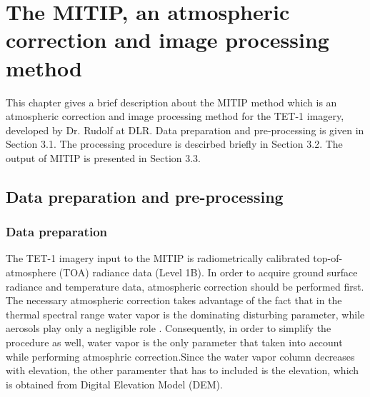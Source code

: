 \chapter{The MITIP, an atmospheric correction and image processing method}

\label{Chapter3}

This chapter gives a brief description about the MITIP method which is an atmospheric correction and image processing method for the TET-1 imagery, developed by Dr. Rudolf at DLR. Data preparation and pre-processing is given in Section 3.1. The processing procedure is descirbed briefly in Section 3.2. The output of MITIP is presented in Section 3.3.\\


\section{Data preparation and pre-processing}


\subsection{Data preparation}
The TET-1 imagery input to the MITIP is radiometrically calibrated top-of-atmosphere (TOA) radiance data (Level 1B). In order to acquire ground surface radiance and temperature data, atmospheric correction should be performed first.\\

\noindent The necessary atmospheric correction takes advantage of the fact that in the thermal spectral range water vapor is the dominating disturbing parameter, while aerosols play only a negligible role \parencite{Reference204}. Consequently, in order to simplify the procedure as well, water vapor is the only parameter that taken into account while performing atmosphric correction.Since the water vapor column decreases with elevation, the other paramenter that has to included is the elevation, which is obtained from Digital Elevation Model (DEM).\\

